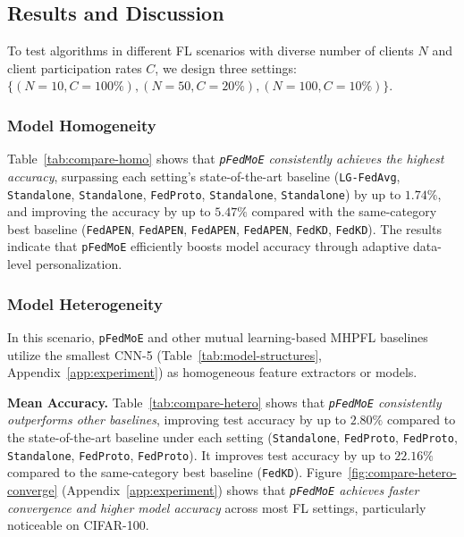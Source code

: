 \documentclass[sigconf]{acmart}
\newcommand{\homo}{homogeneous }
\newcommand{\sota}{state-of-the-art }
\newcommand{\methodname}{{\tt{pFedMoE}}}
\begin{document}
\subsection{Results and Discussion}
To test algorithms in different FL scenarios with diverse number of clients $N$ and client participation rates $C$, we design three settings: $\{(N=10, C=100\%), (N=50, C=20\%), (N=100, C=10\%)\}$.

\subsubsection{Model Homogeneity}
Table~\ref{tab:compare-homo} shows that \textit{\methodname{} consistently achieves the highest accuracy}, surpassing each setting's \sota baseline ({{\tt{LG-FedAvg}}, {\tt{Standalone}}, {\tt{Standalone}},  {\tt{FedProto}}, {\tt{Standalone}}, {\tt{Standalone}}}) by up to $1.74\%$, and improving the accuracy by up to $5.47\%$ compared with the same-category best baseline ({{\tt{FedAPEN}}, {\tt{FedAPEN}}, {\tt{FedAPEN}}, {\tt{FedAPEN}}, {\tt{FedKD}}, {\tt{FedKD}}}). The results indicate that \methodname{} efficiently boosts model accuracy through adaptive data-level personalization.




\subsubsection{Model Heterogeneity}
In this scenario, \methodname{} and other mutual learning-based MHPFL baselines utilize the smallest CNN-5 (Table~\ref{tab:model-structures}, Appendix~\ref{app:experiment}) as \homo feature extractors or models.

\textbf{Mean Accuracy.}
Table~\ref{tab:compare-hetero} shows that \textit{\methodname{} consistently outperforms other baselines}, improving test accuracy by up to $2.80\%$ compared to the \sota baseline under each setting ({{\tt{Standalone}}, {\tt{FedProto}}, {\tt{FedProto}}, {\tt{Standalone}}, {\tt{FedProto}}, {\tt{FedProto}}}). It improves test accuracy by up to $22.16\%$ compared to the same-category best baseline ({\tt{FedKD}}). Figure~\ref{fig:compare-hetero-converge} (Appendix~\ref{app:experiment}) shows 
that \textit{\methodname{} achieves faster convergence and higher model accuracy} across most FL settings, particularly noticeable on CIFAR-100.
\end{document}
